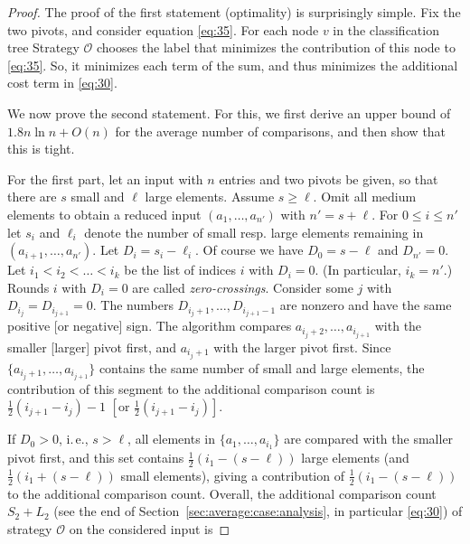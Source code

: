 \documentclass[prodmode,acmtalg]{acmsmall}
\begin{document}
\begin{proof}
    The proof of the first statement (optimality) is surprisingly simple. Fix the two pivots, and consider equation
    \eqref{eq:35}. For each node $v$ in the classification tree Strategy $\mathcal{O}$ chooses the label
    that minimizes the contribution of this node to \eqref{eq:35}. So,
    it minimizes each term of the sum, and thus minimizes the additional cost
    term in \eqref{eq:30}. 


We now prove the second statement. For this, we first derive an upper bound of $1.8 n \ln n + O(n)$ for the 
    average number of comparisons, and then show that this is tight. 

    For the first part, let an input with $n$ entries and two pivots be given,
    so that there are $s$ small and $\ell$ large elements. Assume $s \geq
    \ell$. Omit all medium elements to obtain a reduced input $(a_1, \ldots,
    a_{n'})$ with $n' = s + \ell$. For $0 \leq i \leq n'$ let $s_i$ and
    $\ell_i$ denote the number of small resp. large elements remaining in
    $(a_{i + 1}, \ldots, a_{n'})$. Let $D_i = s_i - \ell_i$. Of course we have
    $D_0 = s - \ell$ and $D_{n'} = 0$.  Let $i_1 < i_2 < \dots  < i_k$ be the
    list of indices $i$ with $D_i = 0$. (In particular, $i_k = n'$.) Rounds $i$
    with $D_i = 0$ are called \emph{zero-crossings}. Consider some $j$ with
    $D_{i_j} = D_{i_{j + 1}} = 0$. The numbers $D_{i_j + 1}, \ldots,  D_{i_{j +
    1} - 1}$ are nonzero and have the same positive [or negative] sign. The
    algorithm compares $a_{i_j + 2},\ldots, a_{i_{j + 1}}$ with the smaller
    [larger] pivot first, and $a_{i_j + 1}$ with the larger pivot first.  Since
    $\{a_{i_j + 1},\ldots, a_{i_{j + 1}}\}$ contains the same number of small
    and large elements, the contribution of this segment to the additional
    comparison count is $\frac12(i_{j + 1} - i_j) - 1$ $\left[\text{or }
    \frac12(i_{j + 1} - i_j)\right]$.

    If $D_0 > 0$, i.\,e., $s > \ell$, all elements in $\{a_1, \ldots,
    a_{i_1}\}$ are compared with the smaller pivot first, and this set contains
    $\frac12 (i_1 - (s - \ell))$ large elements (and $\frac12(i_1 + (s -
    \ell))$ small elements), giving a contribution of $\frac12 (i_1 - (s -
    \ell))$ to the additional comparison count. Overall, the additional
    comparison count $S_2 + L_2$ (see the end of
    Section~\ref{sec:average:case:analysis}, in particular \eqref{eq:30}) of
    strategy $\mathcal{O}$ on the considered input is 


\end{proof}
\end{document}
